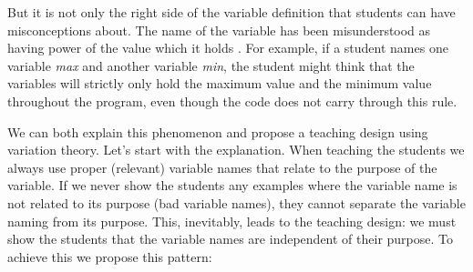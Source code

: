 But it is not only the right side of the variable definition that students 
can 
have misconceptions about. The name of the variable has been misunderstood 
as 
having power of the value which it holds 
\parencite{MisconceptionsSurvey2017,Sleeman1984}. For example, if a student 
names one variable \emph{max} and another variable \emph{min}, the student 
might think that the variables will strictly only hold the maximum value 
and 
the minimum value throughout the program, even though the code does not 
carry through this rule. 

We can both explain this phenomenon and propose a teaching design using 
variation theory.
Let's start with the explanation.
When teaching the students we always use proper (\ie relevant) variable 
names 
that relate to the purpose of the variable.
If we never show the students any examples where the variable name is not 
related to its purpose (bad variable names), they cannot separate the 
variable 
naming from its purpose.
This, inevitably, leads to the teaching design:
we must show the students that the variable names are independent of their 
purpose. To achieve this we propose this pattern:

